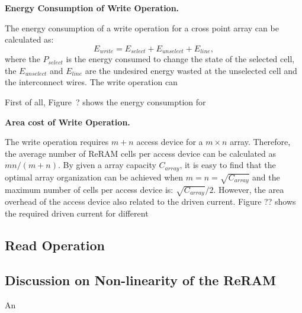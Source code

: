 \vspace{10pt} \textbf{Energy Consumption of Write Operation.} \vspace{8pt}

The energy consumption of a write operation for a cross point array can be
calculated as:
\begin{equation}
E_{write} = E_{select} + E_{unselect} + E_{line},
\end{equation}
where the $P_{select}$ is the energy consumed to change the state of the
selected cell, the $E_{unselect}$ and $E_{line}$ are the undesired energy
wasted at the unselected cell and the interconnect wires. The write
operation can

First of all, Figure~\?? shows the energy consumption for

\vspace{10pt} \textbf{Area cost of Write Operation.} \vspace{8pt}

The write operation requires $m+n$ access device for a $m{\times}n$ array.
Therefore, the average number of ReRAM cells per access device can be
calculated as $mn/(m+n)$. By given a array capacity $C_{array}$, it is
easy to find that the optimal array organization can be achieved when
$m=n=\sqrt{C_{array}}$ and the maximum number of cells per access device
is: $\sqrt{C_{array}}/2$. However, the area overhead of the access device
also related to the driven current. Figure ?? shows the required driven
current for different


\subsection{Read Operation}



\subsection{Discussion on Non-linearity of the ReRAM}
An
